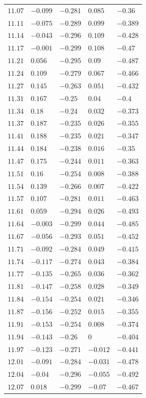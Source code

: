 \begin{center}
\begin{longtable}{lllll}
$11.07$&$-0.099$&$-0.281$&$0.085$&$-0.36$\\
$11.11$&$-0.075$&$-0.289$&$0.099$&$-0.389$\\
$11.14$&$-0.043$&$-0.296$&$0.109$&$-0.428$\\
$11.17$&$-0.001$&$-0.299$&$0.108$&$-0.47$\\
$11.21$&$0.056$&$-0.295$&$0.09$&$-0.487$\\
$11.24$&$0.109$&$-0.279$&$0.067$&$-0.466$\\
$11.27$&$0.145$&$-0.263$&$0.051$&$-0.432$\\
$11.31$&$0.167$&$-0.25$&$0.04$&$-0.4$\\
$11.34$&$0.18$&$-0.24$&$0.032$&$-0.373$\\
$11.37$&$0.187$&$-0.235$&$0.026$&$-0.355$\\
$11.41$&$0.188$&$-0.235$&$0.021$&$-0.347$\\
$11.44$&$0.184$&$-0.238$&$0.016$&$-0.35$\\
$11.47$&$0.175$&$-0.244$&$0.011$&$-0.363$\\
$11.51$&$0.16$&$-0.254$&$0.008$&$-0.388$\\
$11.54$&$0.139$&$-0.266$&$0.007$&$-0.422$\\
$11.57$&$0.107$&$-0.281$&$0.011$&$-0.463$\\
$11.61$&$0.059$&$-0.294$&$0.026$&$-0.493$\\
$11.64$&$-0.003$&$-0.299$&$0.044$&$-0.485$\\
$11.67$&$-0.056$&$-0.293$&$0.051$&$-0.452$\\
$11.71$&$-0.092$&$-0.284$&$0.049$&$-0.415$\\
$11.74$&$-0.117$&$-0.274$&$0.043$&$-0.384$\\
$11.77$&$-0.135$&$-0.265$&$0.036$&$-0.362$\\
$11.81$&$-0.147$&$-0.258$&$0.028$&$-0.349$\\
$11.84$&$-0.154$&$-0.254$&$0.021$&$-0.346$\\
$11.87$&$-0.156$&$-0.252$&$0.015$&$-0.355$\\
$11.91$&$-0.153$&$-0.254$&$0.008$&$-0.374$\\
$11.94$&$-0.143$&$-0.26$&$0$&$-0.404$\\
$11.97$&$-0.123$&$-0.271$&$-0.012$&$-0.441$\\
$12.01$&$-0.091$&$-0.284$&$-0.031$&$-0.478$\\
$12.04$&$-0.04$&$-0.296$&$-0.055$&$-0.492$\\
$12.07$&$0.018$&$-0.299$&$-0.07$&$-0.467$\\

\end{longtable}
\end{center}
